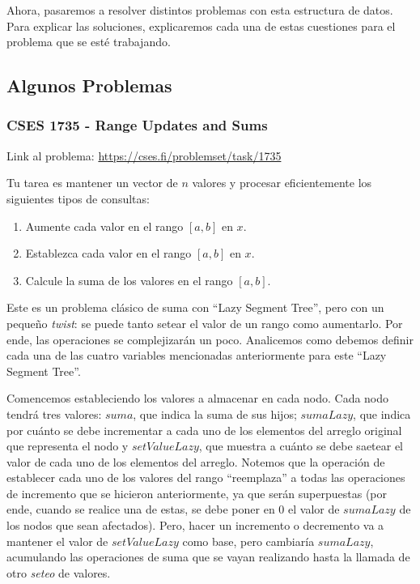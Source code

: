 \documentclass{article}
\begin{document}
Ahora, pasaremos a resolver distintos problemas con esta estructura de datos. Para explicar las soluciones, explicaremos cada una de estas cuestiones para el problema que se esté trabajando.

\subsection{Algunos Problemas}

\subsubsection{CSES 1735 - Range Updates and Sums}
Link al problema: \href{https://cses.fi/problemset/task/1735}{https://cses.fi/problemset/task/1735}
\begin{tcolorbox}
Tu tarea es mantener un vector de $n$ valores y procesar eficientemente los siguientes tipos de consultas:
\begin{enumerate}
    \item Aumente cada valor en el rango $[a,b]$ en $x$.
    \item Establezca cada valor en el rango $[a,b]$ en $x$.
    \item Calcule la suma de los valores en el rango $[a,b]$.
\end{enumerate}
\end{tcolorbox}

Este es un problema clásico de suma con ``Lazy Segment Tree'', pero con un pequeño \textit{twist}: se puede tanto setear el valor de un rango como aumentarlo. Por ende, las operaciones se complejizarán un poco. Analicemos como debemos definir cada una de las cuatro variables mencionadas anteriormente para este  ``Lazy Segment Tree''.

Comencemos estableciendo los valores a almacenar en cada nodo. Cada nodo tendrá tres valores: $suma$, que indica la suma de sus hijos; $sumaLazy$, que indica por cuánto se debe incrementar a cada uno de los elementos del arreglo original que representa el nodo y $setValueLazy$, que muestra a cuánto se debe saetear el valor de cada uno de los elementos del arreglo. Notemos que la operación de establecer cada uno de los valores del rango ``reemplaza'' a todas las operaciones de incremento que se hicieron anteriormente, ya que serán superpuestas (por ende, cuando se realice una de estas, se debe poner en $0$ el valor de $sumaLazy$ de los nodos que sean afectados). Pero, hacer un incremento o decremento va a mantener el valor de $setValueLazy$ como base, pero cambiaría $sumaLazy$, acumulando las operaciones de suma que se vayan realizando hasta la llamada de otro \textit{seteo} de valores.
\end{document}
